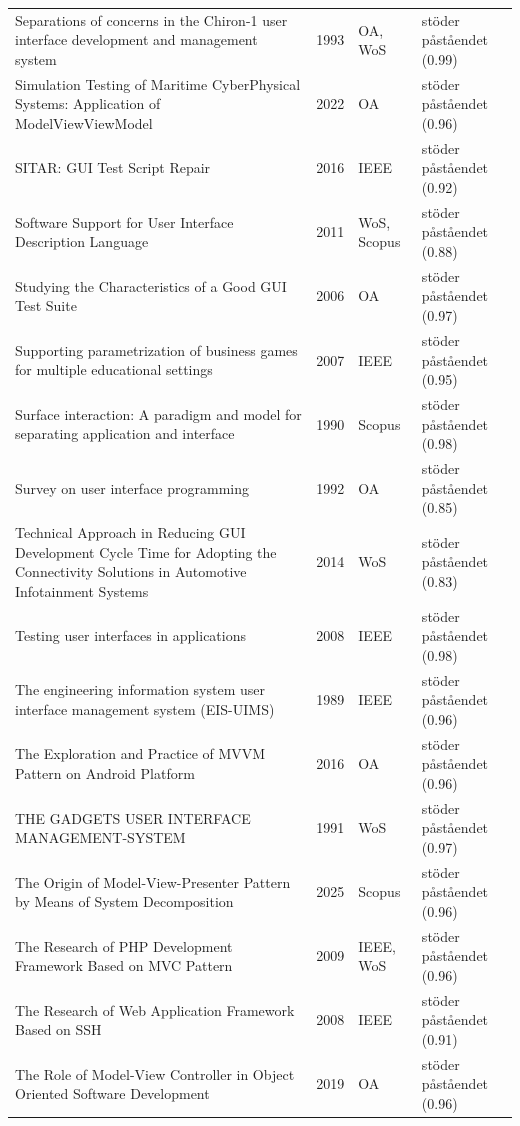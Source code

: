 \begin{longtable}{@{}%
  >{\raggedright\arraybackslash}p{}c%
  >{\raggedright\arraybackslash}p{}%
  >{\raggedright\arraybackslash}p{}@{}}
Separations of concerns in the Chiron-1 user interface development and management system & 1993 & OA, WoS & stöder påståendet (0.99) \\
Simulation Testing of Maritime CyberPhysical Systems: Application of ModelViewViewModel & 2022 & OA & stöder påståendet (0.96) \\
SITAR: GUI Test Script Repair & 2016 & IEEE & stöder påståendet (0.92) \\
Software Support for User Interface Description Language & 2011 & WoS, Scopus & stöder påståendet (0.88) \\
Studying the Characteristics of a \textquotedbl{}Good\textquotedbl{} GUI Test Suite & 2006 & OA & stöder påståendet (0.97) \\
Supporting parametrization of business games for multiple educational settings & 2007 & IEEE & stöder påståendet (0.95) \\
Surface interaction: A paradigm and model for separating application and interface & 1990 & Scopus & stöder påståendet (0.98) \\
Survey on user interface programming & 1992 & OA & stöder påståendet (0.85) \\
Technical Approach in Reducing GUI Development Cycle Time for Adopting the Connectivity Solutions in Automotive Infotainment Systems & 2014 & WoS & stöder påståendet (0.83) \\
Testing user interfaces in applications & 2008 & IEEE & stöder påståendet (0.98) \\
The engineering information system user interface management system (EIS-UIMS) & 1989 & IEEE & stöder påståendet (0.96) \\
The Exploration and Practice of MVVM Pattern on Android Platform & 2016 & OA & stöder påståendet (0.96) \\
THE GADGETS USER INTERFACE MANAGEMENT-SYSTEM & 1991 & WoS & stöder påståendet (0.97) \\
The Origin of Model-View-Presenter Pattern by Means of System Decomposition & 2025 & Scopus & stöder påståendet (0.96) \\
The Research of PHP Development Framework Based on MVC Pattern & 2009 & IEEE, WoS & stöder påståendet (0.96) \\
The Research of Web Application Framework Based on SSH & 2008 & IEEE & stöder påståendet (0.91) \\
The Role of Model-View Controller in Object Oriented Software Development & 2019 & OA & stöder påståendet (0.96) \\

\end{longtable}

